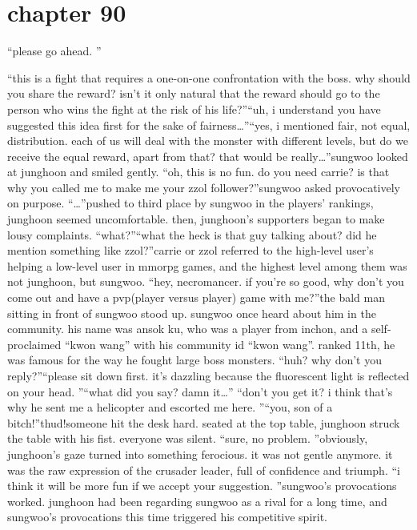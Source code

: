 \section{chapter 90}

                            “please go ahead.
”




“this is a fight that requires a one-on-one confrontation with the boss.
 why should you share the reward? isn’t it only natural that the reward should go to the person who wins the fight at the risk of his life?”“uh, i understand you have suggested this idea first for the sake of fairness…”“yes, i mentioned fair, not equal, distribution.
 each of us will deal with the monster with different levels, but do we receive the equal reward, apart from that? that would be really…”sungwoo looked at junghoon and smiled gently.
“oh, this is no fun.
 do you need carrie? is that why you called me to make me your zzol follower?”sungwoo asked provocatively on purpose.
“…”pushed to third place by sungwoo in the players’ rankings, junghoon seemed uncomfortable.
then, junghoon’s supporters began to make lousy complaints.
“what?”“what the heck is that guy talking about? did he mention something like zzol?”carrie or zzol referred to the high-level user’s helping a low-level user in mmorpg games, and the highest level among them was not junghoon, but sungwoo.
“hey, necromancer.
 if you’re so good, why don’t you come out and have a pvp(player versus player) game with me?”the bald man sitting in front of sungwoo stood up.
 sungwoo once heard about him in the community.
his name was ansok ku, who was a player from inchon, and a self-proclaimed “kwon wang” with his community id “kwon wang”.
 ranked 11th, he was famous for the way he fought large boss monsters.
“huh? why don’t you reply?”“please sit down first.
 it’s dazzling because the fluorescent light is reflected on your head.
”“what did you say? damn it…”
“don’t you get it? i think that’s why he sent me a helicopter and escorted me here.
”“you, son of a bitch!”thud!someone hit the desk hard.
seated at the top table, junghoon struck the table with his fist.
everyone was silent.
“sure, no problem.
”obviously, junghoon’s gaze turned into something ferocious.
 it was not gentle anymore.
 it was the raw expression of the crusader leader, full of confidence and triumph.
“i think it will be more fun if we accept your suggestion.
”sungwoo’s provocations worked.
 junghoon had been regarding sungwoo as a rival for a long time, and sungwoo’s provocations this time triggered his competitive spirit.
